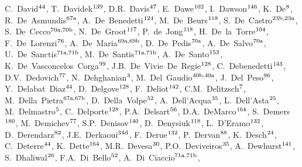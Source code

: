 \begin{flushleft}
C.~David$^\textrm{\scriptsize 44}$,    
T.~Davidek$^\textrm{\scriptsize 139}$,    
D.R.~Davis$^\textrm{\scriptsize 47}$,    
E.~Dawe$^\textrm{\scriptsize 102}$,    
I.~Dawson$^\textrm{\scriptsize 146}$,    
K.~De$^\textrm{\scriptsize 8}$,    
R.~De~Asmundis$^\textrm{\scriptsize 67a}$,    
A.~De~Benedetti$^\textrm{\scriptsize 124}$,    
M.~De~Beurs$^\textrm{\scriptsize 118}$,    
S.~De~Castro$^\textrm{\scriptsize 23b,23a}$,    
S.~De~Cecco$^\textrm{\scriptsize 70a,70b}$,    
N.~De~Groot$^\textrm{\scriptsize 117}$,    
P.~de~Jong$^\textrm{\scriptsize 118}$,    
H.~De~la~Torre$^\textrm{\scriptsize 104}$,    
F.~De~Lorenzi$^\textrm{\scriptsize 76}$,    
A.~De~Maria$^\textrm{\scriptsize 69a,69b}$,    
D.~De~Pedis$^\textrm{\scriptsize 70a}$,    
A.~De~Salvo$^\textrm{\scriptsize 70a}$,    
U.~De~Sanctis$^\textrm{\scriptsize 71a,71b}$,    
M.~De~Santis$^\textrm{\scriptsize 71a,71b}$,    
A.~De~Santo$^\textrm{\scriptsize 153}$,    
K.~De~Vasconcelos~Corga$^\textrm{\scriptsize 99}$,    
J.B.~De~Vivie~De~Regie$^\textrm{\scriptsize 128}$,    
C.~Debenedetti$^\textrm{\scriptsize 143}$,    
D.V.~Dedovich$^\textrm{\scriptsize 77}$,    
N.~Dehghanian$^\textrm{\scriptsize 3}$,    
M.~Del~Gaudio$^\textrm{\scriptsize 40b,40a}$,    
J.~Del~Peso$^\textrm{\scriptsize 96}$,    
Y.~Delabat~Diaz$^\textrm{\scriptsize 44}$,    
D.~Delgove$^\textrm{\scriptsize 128}$,    
F.~Deliot$^\textrm{\scriptsize 142}$,    
C.M.~Delitzsch$^\textrm{\scriptsize 7}$,    
M.~Della~Pietra$^\textrm{\scriptsize 67a,67b}$,    
D.~Della~Volpe$^\textrm{\scriptsize 52}$,    
A.~Dell'Acqua$^\textrm{\scriptsize 35}$,    
L.~Dell'Asta$^\textrm{\scriptsize 25}$,    
M.~Delmastro$^\textrm{\scriptsize 5}$,    
C.~Delporte$^\textrm{\scriptsize 128}$,    
P.A.~Delsart$^\textrm{\scriptsize 56}$,    
D.A.~DeMarco$^\textrm{\scriptsize 164}$,    
S.~Demers$^\textrm{\scriptsize 180}$,    
M.~Demichev$^\textrm{\scriptsize 77}$,    
S.P.~Denisov$^\textrm{\scriptsize 140}$,    
D.~Denysiuk$^\textrm{\scriptsize 118}$,    
L.~D'Eramo$^\textrm{\scriptsize 132}$,    
D.~Derendarz$^\textrm{\scriptsize 82}$,    
J.E.~Derkaoui$^\textrm{\scriptsize 34d}$,    
F.~Derue$^\textrm{\scriptsize 132}$,    
P.~Dervan$^\textrm{\scriptsize 88}$,    
K.~Desch$^\textrm{\scriptsize 24}$,    
C.~Deterre$^\textrm{\scriptsize 44}$,    
K.~Dette$^\textrm{\scriptsize 164}$,    
M.R.~Devesa$^\textrm{\scriptsize 30}$,    
P.O.~Deviveiros$^\textrm{\scriptsize 35}$,    
A.~Dewhurst$^\textrm{\scriptsize 141}$,    
S.~Dhaliwal$^\textrm{\scriptsize 26}$,    
F.A.~Di~Bello$^\textrm{\scriptsize 52}$,    
A.~Di~Ciaccio$^\textrm{\scriptsize 71a,71b}$,    

\end{flushleft}
